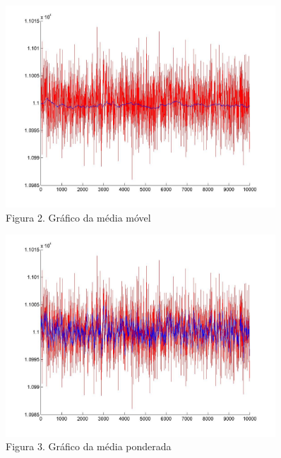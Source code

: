 \documentclass[12pt, a4paper, twoside]{article}
\begin{document}
\begin{figure}
  \includegraphics[width=0.9\textwidth]{mediamovel.jpg}
  \caption{Figura 2. Gráfico da média móvel}
\end{figure}

\begin{figure}
  \includegraphics[width=0.9\textwidth]{mediaponderada.jpg}
  \caption{Figura 3. Gráfico da média ponderada}
\end{figure}
\end{document}
